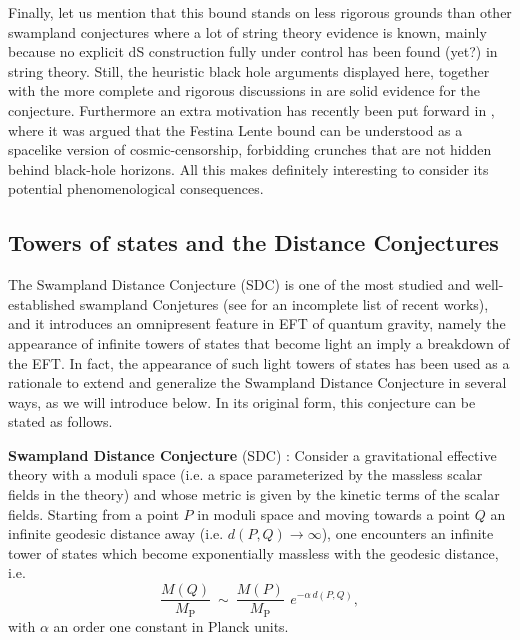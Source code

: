 \documentclass[11pt,a4paper]{article}
\def\mp{{M_{\text{P}}}}
\begin{document}
Finally, let us mention that this bound stands on less rigorous grounds than other swampland conjectures where a lot of string theory evidence is known, mainly because no explicit dS construction fully under control has been found (yet?) in string theory. Still, the heuristic black hole arguments displayed here, together with the more complete and rigorous discussions in \cite{Montero:2019ekk, Montero:2021otb} are solid evidence for the conjecture. Furthermore an extra motivation has recently been put forward in \cite{Montero:2021otb}, where it was argued that the Festina Lente bound can be understood as a spacelike version of cosmic-censorship, forbidding crunches that are not hidden behind black-hole horizons. All this makes definitely interesting to consider its potential phenomenological consequences.



\subsection{Towers of states and the Distance Conjectures}

\label{sec:towers}

The Swampland Distance Conjecture (SDC) \cite{Ooguri:2006in} is one of the most studied and well-established swampland Conjetures (see \cite{Baume:2016, Klaewer:2016kiy,Blumenhagen:2017cxt, Blumenhagen:2018nts,Grimm:2018ohb,Grimm:2018cpv, Corvilain:2018lgw, Lee:2019xtm,Lee:2019wij,Blumenhagen:2019qcg,Marchesano:2019ifh,Font:2019cxq,Grimm:2019wtx,Baume:2019sry, Gendler:2020dfp,Baume:2020dqd,Perlmutter:2020buo, Bastian:2020egp,Klaewer:2020lfg,Calderon-Infante:2020dhm} for an incomplete list of recent works), and it introduces an omnipresent feature in EFT of quantum gravity, namely the appearance of infinite towers of states that become light an imply a breakdown of the EFT. In fact, the appearance of such light towers of states has been used as a rationale to extend and generalize the Swampland Distance Conjecture in several ways, as we will introduce below. In its original form, this conjecture can be stated as follows.
\vspace{0.2cm}
\begin{tcolorbox}[colback=boxblue]
\textbf{Swampland Distance Conjecture} (SDC) \cite{Ooguri:2006in}: Consider a gravitational effective theory with a moduli space (i.e. a space parameterized by the massless scalar fields in the theory) and whose metric is given by the kinetic terms of the scalar fields. Starting from a point $P$ in moduli space and moving towards a point $Q$ an infinite geodesic distance away (i.e.  $d(P,Q)\rightarrow \infty$), one encounters an infinite tower of states which become exponentially massless with the geodesic distance, i.e. 
\begin{equation}
\dfrac{M(Q)}{\mp}\ \sim \ \dfrac{ M(P)}{\mp} \ \, e^{-\alpha \,  d(P,Q)},
\end{equation}
with $\alpha$ an order one constant in Planck units. 
\end{tcolorbox}
\end{document}
